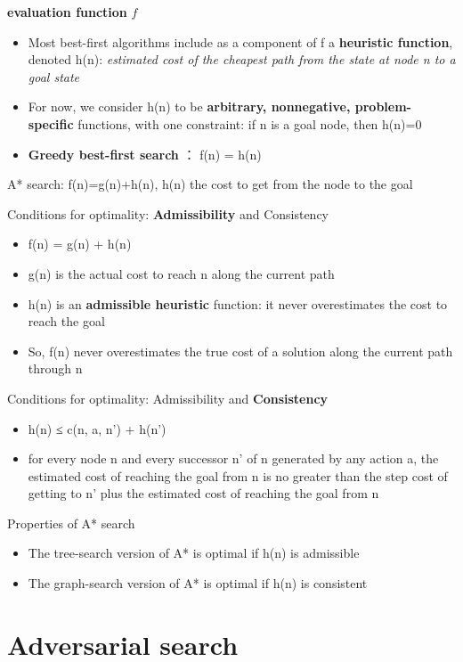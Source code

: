 \documentclass[11pt]{article}
\begin{document}
\textbf{evaluation function} \(f\)
\begin{itemize}
\item Most best-first algorithms include as a component of f a \textbf{heuristic
function}, denoted h(n): \emph{estimated cost of the cheapest path from the state 
at node n to a goal state}
\item For now, we consider h(n) to be \textbf{arbitrary, nonnegative, problem-specific}
functions, with one constraint: if n is a goal node, then h(n)=0
\item \textbf{Greedy best-first search} ： f(n) = h(n)
\end{itemize}


A* search:
f(n)=g(n)+h(n), h(n) the cost to get from the node to the goal


Conditions for optimality: \textbf{Admissibility} and Consistency
\begin{itemize}
\item f(n) = g(n) + h(n)
\item g(n) is the actual cost to reach n along the current path
\item h(n) is an \textbf{admissible heuristic} function: it never overestimates the cost
to reach the goal
\item So, f(n) never overestimates the true cost of a solution along the current
path through n
\end{itemize}


Conditions for optimality: Admissibility and \textbf{Consistency}
\begin{itemize}
\item h(n) ≤ c(n, a, n') + h(n')
\item for every node n and every successor n’ of n generated by any action a,
the estimated cost of reaching the goal from n is no greater than the step
cost of getting to n’ plus the estimated cost of reaching the goal from n
\end{itemize}


Properties of A* search
\begin{itemize}
\item The tree-search version of A* is optimal if h(n) is admissible
\item The graph-search version of A* is optimal if h(n) is consistent
\end{itemize}
\section{Adversarial search}
\label{sec:orge1a9fe4}
\end{document}
